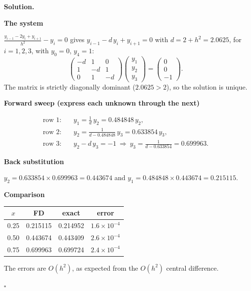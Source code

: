 \documentclass[11pt,a4paper]{article}
\newenvironment{solution}
  {\par\noindent\textbf{Solution.}\par\nobreak}
  {\par\nobreak\noindent\hfill\(\square\)\par}
\newcommand{\step}[1]{\par\addvspace{0.5em}\noindent\textbf{#1}\par\nobreak}
\begin{document}
\begin{solution}
\step{The system}
\(\frac{y_{i-1}-2y_i+y_{i+1}}{h^2}-y_i=0\) gives
\(y_{i-1}-d\,y_i+y_{i+1}=0\) with \(d=2+h^2=2.0625\), for \(i=1,2,3\),
with \(y_0=0\), \(y_4=1\):
\[
  \begin{pmatrix}-d&1&0\\1&-d&1\\0&1&-d\end{pmatrix}
  \begin{pmatrix}y_1\\y_2\\y_3\end{pmatrix}
  =\begin{pmatrix}0\\0\\-1\end{pmatrix}.
\]
The matrix is strictly diagonally dominant (\(2.0625>2\)), so the
solution is unique.

\step{Forward sweep (express each unknown through the next)}
\begin{align*}
  \text{row 1:}&\quad y_1=\frac1d\,y_2=0.484848\,y_2,\\
  \text{row 2:}&\quad y_2=\frac1{d-0.484848}\,y_3=0.633854\,y_3,\\
  \text{row 3:}&\quad y_2-d\,y_3=-1\ \Rightarrow\
    y_3=\frac1{d-0.633854}=0.699963 .
\end{align*}

\step{Back substitution}
\(y_2=0.633854\times0.699963=0.443674\) and
\(y_1=0.484848\times0.443674=0.215115\).

\step{Comparison}
\begin{center}
\begin{tabular}{@{}cccc@{}}
\toprule
\(x\) & FD & exact & error\\
\midrule
0.25 & 0.215115 & 0.214952 & \(1.6\times10^{-4}\)\\
0.50 & 0.443674 & 0.443409 & \(2.6\times10^{-4}\)\\
0.75 & 0.699963 & 0.699724 & \(2.4\times10^{-4}\)\\
\bottomrule
\end{tabular}
\end{center}
The errors are \(O(h^2)\), as expected from the \(O(h^2)\) central
difference.
\end{solution}
\end{document}
